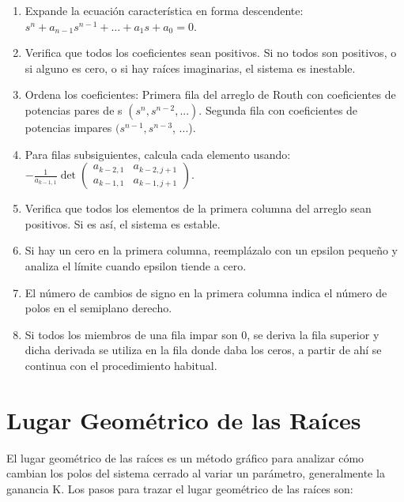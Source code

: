 \documentclass[legalpaper,twocolumn]{article}
\begin{document}
\begin{enumerate}
    \item Expande la ecuación característica en forma descendente: \( s^n + a_{n-1} s^{n-1} + \dots + a_1 s + a_0 = 0 \).
    \item Verifica que todos los coeficientes sean positivos. Si no todos son positivos, o si alguno es cero, o si hay raíces imaginarias, el sistema es inestable.
    \item Ordena los coeficientes: Primera fila del arreglo de Routh con coeficientes de potencias pares de s $(s^n, s^{n-2}, ...)$. Segunda fila con coeficientes de potencias impares $(s^{n-1}, s^{n-3}$, ...).
    \item Para filas subsiguientes, calcula cada elemento usando: \( -\frac{1}{a_{k-1,1}} \det \begin{pmatrix} a_{k-2,1} & a_{k-2,j+1} \\ a_{k-1,1} & a_{k-1,j+1} \end{pmatrix} \).
    \item Verifica que todos los elementos de la primera columna del arreglo sean positivos. Si es así, el sistema es estable.
    \item Si hay un cero en la primera columna, reemplázalo con un epsilon pequeño y analiza el límite cuando epsilon tiende a cero.
    \item El número de cambios de signo en la primera columna indica el número de polos en el semiplano derecho.
    \item Si todos los miembros de una fila impar son 0, se deriva la fila superior y dicha derivada se utiliza en la fila donde daba los ceros, a partir de ahí se continua con el procedimiento habitual.
\end{enumerate}

\section*{Lugar Geométrico de las Raíces}

El lugar geométrico de las raíces es un método gráfico para analizar cómo cambian los polos del sistema cerrado al variar un parámetro, generalmente la ganancia K. Los pasos para trazar el lugar geométrico de las raíces son:
\end{document}
